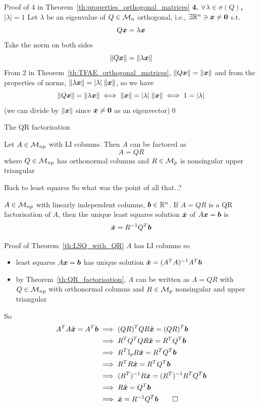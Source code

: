 \documentclass[aspectratio=169]{beamer}\usepackage[]{graphicx}\usepackage[]{xcolor}
\begin{document}
\begin{frame}{Proof of 4 in Theorem~\ref{th:properties_orthogonal_matrices}}
\textbf{4. $\forall\lambda\in\sigma(Q)$, $|\lambda|=1$}
\vfill
Let $\lambda$ be an eigenvalue of $Q\in\mathcal{M}_n$ orthogonal, i.e., $\exists\IR^n\ni\bx\neq\b0$ s.t.
\[
Q\bm{x} = \lambda\bm{x}
\]
Take the norm on both sides
\[
\|Q\bm{x}\| = \|\lambda\bm{x}\|
\]
From 2 in Theorem~\ref{th:TFAE_orthogonal_matrices}, $\|Q\bm{x}\|=\|\bm{x}\|$ and from the properties of norms, $\|\lambda\bm{x}\|=|\lambda|\;\|\bm{x}\|$, so we have
\[
\|Q\bm{x}\| = \|\lambda\bm{x}\| \iff \|\bm{x}\| = |\lambda|\;\|\bm{x}\| \iff 1=|\lambda|
\]
(we can divide by $\|\bm{x}\|$ since $\bx\neq \b0$ as an eigenvector)\hfill\qed
\end{frame}





\begin{frame}{The QR factorisation}
\begin{importanttheorem}\label{th:QR_factorisation}
Let $A\in\mathcal{M}_{np}$ with LI columns. Then $A$ can be factored as
\[
A=QR
\]
where $Q\in\mathcal{M}_{np}$ has orthonormal columns and $R\in\mathcal{M}_p$ is nonsingular upper triangular
\end{importanttheorem}
\end{frame}


\begin{frame}{Back to least squares}
So what was the point of all that..?
\vfill
\begin{importanttheorem}
\label{th:LSQ_with_QR}
$A\in\mathcal{M}_{np}$ with linearly independent columns, $\bm{b}\in\mathbb{R}^n$. If $A=QR$ is a QR factorisation of $A$, then the unique least squares solution $\tilde{\bm{x}}$ of $A\bm{x}=\bm{b}$ is
\[
\tilde{\bm{x}} = R^{-1}Q^T\bm{b}
\]
\end{importanttheorem}
\end{frame}


\begin{frame}{Proof of Theorem~\ref{th:LSQ_with_QR}}
$A$ has LI columns so 
\begin{itemize}
\item least squares $A\bm{x}=\bm{b}$ has unique solution $\tilde{\bm{x}}=(A^TA)^{-1}A^T\bm{b}$
\item by Theorem~\ref{th:QR_factorisation}, $A$ can be written as $A=QR$ with $Q\in\mathcal{M}_{np}$ with orthonormal columns and $R\in\mathcal{M}_p$ nonsingular and upper triangular
\end{itemize}
So
\begin{align*}
A^TA\tilde\bx= A^T\bb &\implies (QR)^TQR\tilde\bx = (QR)^T\bb \\
&\implies R^TQ^TQR\tilde\bx = R^TQ^T\bb \\
&\implies R^T\II_pR\tilde\bx = R^TQ^T\bb \\
&\implies R^TR\tilde\bx = R^TQ^T\bb \\
&\implies (R^T)^{-1}R\tilde\bx = (R^T)^{-1}R^TQ^T\bb \\
&\implies R\tilde\bx = Q^T\bb \\
&\implies \tilde\bx = R^{-1}Q^T\bb\hfill\qed
\end{align*}
\end{frame}
\end{document}

